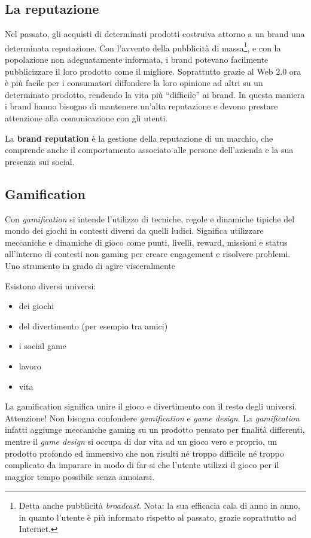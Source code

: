 \subsection{La reputazione}

Nel passato, gli acquisti di determinati prodotti costruiva attorno a un brand
una determinata reputazione. Con l'avvento della pubblicità di
massa\footnote{Detta anche pubblicità \textit{broadcast}. Nota: la sua
efficacia cala di anno in anno, in quanto l'utente è più informato rispetto al
passato, grazie soprattutto ad Internet.}, e con la popolazione non
adeguatamente informata, i brand potevano facilmente pubblicizzare
il loro prodotto come il migliore. Soprattutto grazie al Web 2.0 ora
è più facile per i consumatori diffondere la loro opinione ad altri su un
determinato prodotto, rendendo la vita più ``difficile'' ai brand. In questa
maniera i brand hanno bisogno di mantenere un'alta reputazione e devono
prestare attenzione alla comunicazione con gli utenti.

La \textbf{brand reputation} è la gestione della reputazione di un marchio, che
comprende anche il comportamento associato alle persone dell'azienda e la sua
presenza sui social.

\subsection{Gamification}

Con \emph{gamification} si intende l'utilizzo di tecniche, regole e dinamiche
tipiche del mondo dei giochi in contesti diversi da quelli ludici. Significa
utilizzare meccaniche e dinamiche di gioco come punti, livelli, reward,
missioni e status all'interno di contesti non gaming per creare engagement e
risolvere problemi.
Uno strumento in grado di agire visceralmente 

Esistono diversi universi:
\begin{itemize}
 \item dei giochi
 \item del divertimento (per esempio tra amici)
 \item i social game
 \item lavoro
 \item vita
\end{itemize}

La gamification significa unire il gioco e divertimento con il resto degli
universi. Attenzione! Non bisogna confondere \emph{gamification} e \emph{game
design}. La \emph{gamification} infatti aggiunge meccaniche gaming su un
prodotto pensato per finalità differenti, mentre il \textit{game design} si
occupa di dar vita ad un gioco vero e proprio, un prodotto profondo ed
immersivo che non risulti né troppo difficile né troppo complicato da imparare
in modo di far si che l'utente utilizzi il gioco per il maggior tempo possibile
senza annoiarsi.

